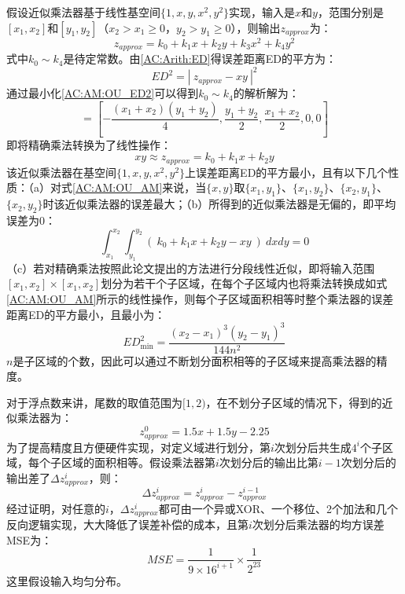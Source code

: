 假设近似乘法器基于线性基空间$\{1, x, y, x^2, y^2\}$实现，输入是$x$和$y$，范围分别是$[x_1,x_2]$和$[y_1,y_2]$（$x_2 > x_1 \ge 0$，$y_2 > y_1 \ge 0$），则输出$z_{approx}$为：
\begin{equation}
    z_{approx} = k_0 + k_1 x + k_2 y + k_3 x^2 + k_4 y^2
\end{equation}
式中$k_0 \sim k_4$是待定常数。由\eqref{AC:Arith:ED}得误差距离ED的平方为：
\begin{equation}
    ED^2 = | \ z_{approx} - xy \ | ^2
\label{AC:AM:OU_ED2}
\end{equation}
通过最小化\eqref{AC:AM:OU_ED2}可以得到$k_0 \sim k_4$的解析解为：
\begin{equation}
    [k_{0}, k_{1}, k_{2}, k_{3}, k_{4}]=[-\frac{(x_{1}+x_{2})(y_{1}+y_{2})}{4},\frac{y_{1}+y_{2}}{2},\frac{x_{1}+x_{2}}{2}, 0,0]
\end{equation}
即将精确乘法转换为了线性操作：
\begin{equation} 
    xy \approx z_{approx} = k_{0}+k_{1}x+k_{2}y
\label{AC:AM:OU_AM}
\end{equation}
该近似乘法器在基空间$\{1, x, y, x^2, y^2\}$上误差距离ED的平方最小，且有以下几个性质：（a）对式\eqref{AC:AM:OU_AM}来说，当$\{x,y\}$取$\{x_1,y_1\}$、$\{x_1,y_2\}$、$\{x_2,y_1\}$、$\{x_2,y_2\}$时该近似乘法器的误差最大；（b）所得到的近似乘法器是无偏的，即平均误差为0：
\begin{equation} 
    \int\nolimits_{x_{1}}^{x_{2}}\int\nolimits_{y_{1}}^{y_{2}} ( \ k_{0}+k_{1}x+k_{2}y - xy \ ) \ dxdy = 0
\end{equation}
（c）若对精确乘法按照此论文提出的方法进行分段线性近似，即将输入范围$[x_1,x_2] \times [x_1,x_2]$划分为若干个子区域，在每个子区域内也将乘法转换成如式\eqref{AC:AM:OU_AM}所示的线性操作，则每个子区域面积相等时整个乘法器的误差距离ED的平方最小，且最小为：
\begin{equation}
    ED^2_\text{min} = \dfrac{ (x_2 - x_1)^3 (y_2 - y_1)^3 }{144 n^2}
\end{equation}
$n$是子区域的个数，因此可以通过不断划分面积相等的子区域来提高乘法器的精度。

对于浮点数来讲，尾数的取值范围为$[1,2)$，在不划分子区域的情况下，得到的近似乘法器为：
\begin{equation}
    z^0_{approx} = 1.5 x + 1.5 y - 2.25
\end{equation}
为了提高精度且方便硬件实现，对定义域进行划分，第$i$次划分后共生成$4^i$个子区域，每个子区域的面积相等。假设乘法器第$i$次划分后的输出比第$i-1$次划分后的输出差了$\Delta z^i_{approx}$，则：
\begin{equation}
    \Delta z^i_{approx} = z^i_{approx} -  z^{i-1}_{approx}
\end{equation}
经过证明，对任意的$i$，$\Delta z^i_{approx}$都可由一个异或XOR、一个移位、2个加法和几个反向逻辑实现，大大降低了误差补偿的成本，且第$i$次划分后乘法器的均方误差MSE为：
\begin{equation}
    MSE = \frac{1}{9\times 16^{i + 1}} \times \frac{1}{2^{23}}
\end{equation}
这里假设输入均匀分布。

